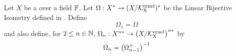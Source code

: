 \label{def:higherorderdualspaceisomorphism}
\newcommand{\NthDualSPaceIso}[1]{
    \bf \hyperref[def:higherorderdualspaceisomorphism]{$\pa{#1}^{th}$ Dual Space Isomorphism} \rm
}
\begin{df}
Let $X$ be a 
\SeminormedSpace
over a field
$\mathbb{F}$. 
Let $\Omega:X^* \to (X/\bf\mathcal{K}\rm^{ernel}_X)^*$ 
be the 
Linear 
Bijective 
Isometry
defined in 
.
Define 
\begin{equation*}
\Omega_1=\Omega
\end{equation*}
and also define, for $2 \leq n \in \mathbb{N}$, 
$\Omega_n:X^{n*} \to \left( X/\bf\mathcal{K}\rm^{ernel}_X\right)^{n*}$
by 
\begin{equation*}
\Omega_n=\left( \Omega_{n-1}^{\times}\right)^{-1}
\end{equation*}
\end{df}
